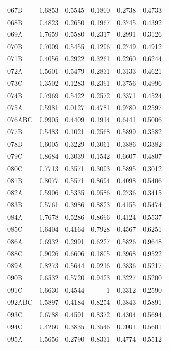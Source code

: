 \begin{longtable}{lrrrrr}
  067B & 0.6853 & 0.5545 & 0.1800 & 0.2738 & 0.4733 \\
  068B & 0.4823 & 0.2650 & 0.1967 & 0.3745 & 0.4392 \\
  069A & 0.7659 & 0.5580 & 0.2317 & 0.2991 & 0.3126 \\
  070B & 0.7009 & 0.5455 & 0.1296 & 0.2749 & 0.4912 \\
  071B & 0.4056 & 0.2922 & 0.3261 & 0.2260 & 0.6244 \\
  072A & 0.5601 & 0.5479 & 0.2831 & 0.3133 & 0.4621 \\
  073C & 0.3502 & 0.1283 & 0.2391 & 0.3756 & 0.4996 \\
  074B & 0.7969 & 0.5422 & 0.2572 & 0.3371 & 0.4524 \\
  075A & 0.5981 & 0.0127 & 0.4781 & 0.9780 & 0.2597 \\
  076ABC & 0.9905 & 0.4409 & 0.1914 & 0.6441 & 0.5006 \\
  077B & 0.5483 & 0.1021 & 0.2568 & 0.5899 & 0.3582 \\
  078B & 0.6005 & 0.3229 & 0.3061 & 0.3886 & 0.3382 \\
  079C & 0.8684 & 0.3039 & 0.1542 & 0.6607 & 0.4807 \\
  080C & 0.7713 & 0.3571 & 0.3093 & 0.5895 & 0.3012 \\
  081B & 0.8077 & 0.5571 & 0.8694 & 0.4098 & 0.5406 \\
  082A & 0.5906 & 0.5335 & 0.9586 & 0.2736 & 0.3415 \\
  083B & 0.5761 & 0.3986 & 0.8823 & 0.4155 & 0.5474 \\
  084A & 0.7678 & 0.5286 & 0.8696 & 0.4124 & 0.5537 \\
  085C & 0.6404 & 0.4164 & 0.7928 & 0.4567 & 0.6251 \\
  086A & 0.6932 & 0.2991 & 0.6227 & 0.5826 & 0.9648 \\
  088C & 0.9026 & 0.6606 & 0.1805 & 0.3968 & 0.9522 \\
  089A & 0.8273 & 0.5644 & 0.9216 & 0.3836 & 0.5217 \\
  090B & 0.6532 & 0.5720 & 0.9423 & 0.3227 & 0.5200 \\
  091C & 0.6630 & 0.4544 & 1 & 0.3312 & 0.2590 \\
  092ABC & 0.5897 & 0.4184 & 0.8254 & 0.3843 & 0.5891 \\
  093C & 0.6788 & 0.4591 & 0.8372 & 0.4304 & 0.5694 \\
  094C & 0.4260 & 0.3835 & 0.3546 & 0.2001 & 0.5601 \\
  095A & 0.5656 & 0.2790 & 0.8331 & 0.4774 & 0.5512 \\

\end{longtable}
